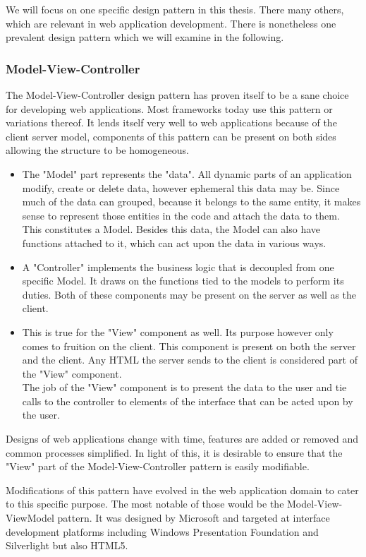 \documentclass[thesis.tex]{subfiles}
\begin{document}
We will focus on one specific design pattern in this thesis. There many others,
which are relevant in web application development. There is nonetheless one
prevalent design pattern which we will examine in the following.

\subsubsection{Model-View-Controller}
The Model-View-Controller design pattern has proven itself to be a sane
choice for developing web applications. Most frameworks today use this
pattern or variations thereof.
It lends itself very well to web applications because of the client server
model, components of this pattern can be present on both sides allowing the
structure to be homogeneous.

\begin{itemize}
	\item The "Model" part represents the "data". All dynamic parts of an
	application modify, create or delete data, however ephemeral this data may
	be. Since much of the data can grouped, because it belongs to the same
	entity, it makes sense to represent those entities in the code and
	attach the data to them. This constitutes a Model. Besides this data,
	the Model can also have functions attached to it, which can act upon the data
	in various ways.
	\item A "Controller" implements the business logic that is decoupled from one
	specific Model. It draws on the functions tied to the models to perform its
	duties. Both of these components may be present on the server as well
	as the client.
	\item This is true for the "View" component as well. Its purpose however only
	comes to fruition on the client. This component is present on both the server
	and the client. Any HTML the server sends to the client is considered part of
	the "View" component.\\
	The job of the "View" component is to present the data to the user and
	tie calls to the controller to elements of the interface that can be acted
	upon by the user.
\end{itemize}

Designs of web applications change with time, features are added or
removed and common processes simplified. In light of this, it is
desirable to ensure that the "View" part of the Model-View-Controller
pattern is easily modifiable.

Modifications of this pattern have evolved in the web application domain to
cater to this specific purpose. The most notable of those would be the
Model-View-ViewModel pattern. It was designed by Microsoft and targeted at
interface development platforms including Windows Presentation Foundation and
Silverlight but also HTML5.
\end{document}
